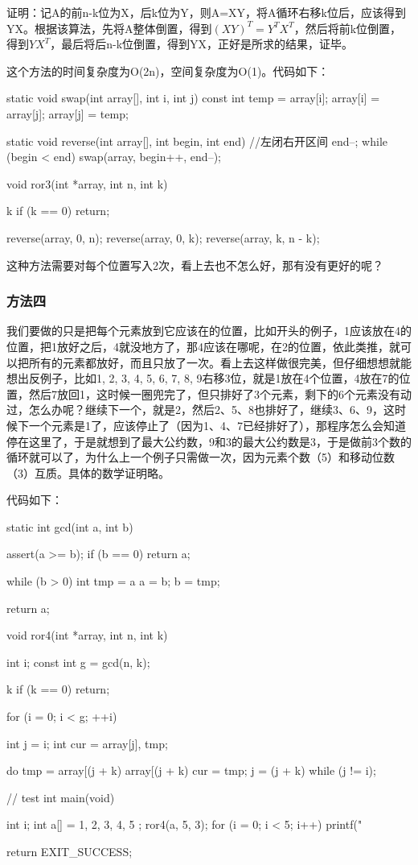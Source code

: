 证明：记A的前n-k位为X，后k位为Y，则A=XY，将A循环右移k位后，应该得到YX。根据该算法，先将A整体倒置，得到$(XY)^T=Y^TX^T$，然后将前k位倒置，得到$YX^T$，最后将后n-k位倒置，得到YX，正好是所求的结果，证毕。

这个方法的时间复杂度为O(2n)，空间复杂度为O(1)。代码如下：

\begin{Codex}[label=ror.c]
static void swap(int array[], int i, int j) {
    const int temp = array[i];
    array[i] = array[j];
    array[j] = temp;
}

static void reverse(int array[], int begin, int end) { //左闭右开区间
    end--;
    while (begin < end)
        swap(array, begin++, end--);
}

void ror3(int *array, int n, int k) {
    k %
    if (k == 0)
        return;

    reverse(array, 0, n);
    reverse(array, 0, k);
    reverse(array, k, n - k);
}
\end{Codex}

这种方法需要对每个位置写入2次，看上去也不怎么好，那有没有更好的呢？

\subsubsection{方法四}
我们要做的只是把每个元素放到它应该在的位置，比如开头的例子，1应该放在4的位置，把1放好之后，4就没地方了，那4应该在哪呢，在2的位置，依此类推，就可以把所有的元素都放好，而且只放了一次。看上去这样做很完美，但仔细想想就能想出反例子，比如{1, 2, 3, 4, 5, 6, 7, 8, 9}右移3位，就是1放在4个位置，4放在7的位置，然后7放回1，这时候一圈兜完了，但只排好了3个元素，剩下的6个元素没有动过，怎么办呢？继续下一个，就是2，然后2、5、8也排好了，继续3、6、9，这时候下一个元素是1了，应该停止了（因为1、4、7已经排好了），那程序怎么会知道停在这里了，于是就想到了最大公约数，9和3的最大公约数是3，于是做前3个数的循环就可以了，为什么上一个例子只需做一次，因为元素个数（5）和移动位数（3）互质。具体的数学证明略。

代码如下：

\begin{Codex}[label=ror.c]
static int gcd(int a, int b) {
    assert(a >= b);
    if (b == 0) {
        return a;
    }

    while (b > 0) {
        int tmp = a %
        a = b;
        b = tmp;
    }

    return a;
}

void ror4(int *array, int n, int k) {
    int i;
    const int g = gcd(n, k);

    k %
    if (k == 0)
        return;

    for (i = 0; i < g; ++i) {
        int j = i;
        int cur = array[j], tmp;

        do {
            tmp = array[(j + k) %
            array[(j + k) %
            cur = tmp;
            j = (j + k) %
        } while (j != i);
    }
}

// test
int main(void) {
    int i;
    int a[] = { 1, 2, 3, 4, 5 };
    ror4(a, 5, 3);
    for (i = 0; i < 5; i++) {
        printf("%
    }

    return EXIT_SUCCESS;
}
\end{Codex}
